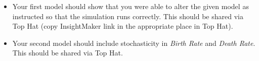 \documentclass[
]{article}
\begin{document}
\begin{itemize}
\begin{itemize}
    \begin{itemize}
    \item
      Your first model should show that you were able to alter the given
      model as instructed so that the simulation runs correctly. This
      should be shared via Top Hat (copy InsightMaker link in the
      appropriate place in Top Hat).
    \item
      Your second model should include stochasticity in \emph{Birth
      Rate} and \emph{Death Rate}. This should be shared via Top Hat.
    \end{itemize}
  \end{itemize}
\end{itemize}
\end{document}
